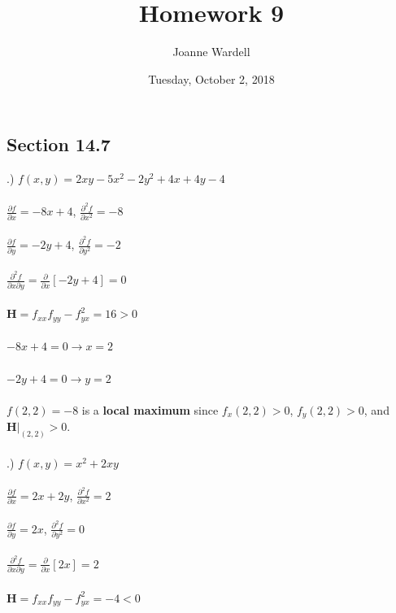 \documentclass[12pt]{article}
\title{\vspace{-2.0cm}Homework 9}
\author{Joanne Wardell}
\date{Tuesday, October 2, 2018}
\begin{document}
\maketitle

\subsection*{Section 14.7}
.) $f(x,y) = 2xy-5x^{2}-2y^{2}+4x + 4y -4$\\\\
\noindent $\frac{\partial f}{\partial x} = -8x + 4$, \hspace{10pt} $\frac{\partial ^{2} f}{\partial x^{2}} = -8$\\\\
\noindent $\frac{\partial f}{\partial y} = -2y + 4$, \hspace{10pt} $\frac{\partial ^{2} f}{\partial y^{2}} = -2$\\\\
\noindent $\frac{\partial^{2} f}{\partial x \partial y } = \frac{\partial }{\partial x}[-2y + 4] = 0$\\\\
\noindent $\mathbf{H} = f_{xx}f_{yy} - f_{yx}^{2} = 16 > 0$\\\\
\noindent $-8x + 4 = 0 \rightarrow x = 2$\\\\
\noindent $-2y + 4 = 0 \rightarrow y = 2$\\\\
\noindent $f(2, 2) = -8$ is a \textbf{local maximum} since $f_{x}(2, 2) > 0$, $f_{y}(2, 2) > 0$, and $\mathbf{H}\Big|_{(2,2)} > 0$.\\\\
.) $f(x, y) = x^{2} + 2xy$\\\\
\noindent $\frac{\partial f}{\partial x} = 2x + 2y$, \hspace{10pt} $\frac{\partial ^{2} f}{\partial x^{2}} = 2$\\\\
\noindent $\frac{\partial f}{\partial y} = 2x$, \hspace{10pt} $\frac{\partial ^{2} f}{\partial y^{2}} = 0$\\\\
\noindent $\frac{\partial^{2} f}{\partial x \partial y } = \frac{\partial }{\partial x}[2x] = 2$\\\\
\noindent $\mathbf{H} = f_{xx}f_{yy} - f_{yx}^{2} = -4 < 0$\\\\
\end{document}
